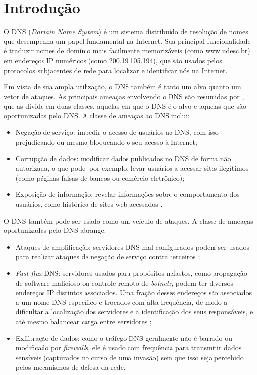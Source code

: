 \chapter{Introdução}
\label{ch:intro}

O DNS (\textit{Domain Name System}) \cite{rfc1034} é um sistema
distribuído de resolução de nomes que desempenha um papel fundamental
na Internet. Sua principal funcionalidade é traduzir nomes de domínio
mais facilmente memorizáveis (como \url{www.udesc.br}) em endereços IP
numéricos (como 200.19.105.194), que são usados pelos protocolos
subjacentes de rede para localizar e identificar nós na Internet.

Em vista de sua ampla utilização, o DNS também é tanto um alvo quanto
um vetor de ataques. As principais ameaças envolvendo o DNS são
resumidas por \cite{Conrad:2012:tidssr}, que as divide em duas
classes, aquelas em que o DNS é o alvo e aquelas que são oportunizadas
pelo DNS\@. A classe de ameaças ao DNS inclui:

\begin{itemize}

\item Negação de serviço: impedir o acesso de usuários ao DNS, com isso
  prejudicando ou mesmo bloqueando o seu acesso à Internet;

\item Corrupção de dados: modificar dados publicados no DNS de forma
  não autorizada, o que pode, por exemplo, levar usuários a acessar
  sites ilegítimos (como páginas falsas de bancos ou comércio
  eletrônico);

\item Exposição de informação: revelar informações sobre o
  comportamento dos usuários, como histórico de sites web acessados \cite{cert3}.
\end{itemize}

O DNS também pode ser usado como um veículo de ataques. A classe de
ameaças oportunizadas pelo DNS abrange:

\begin{itemize}
\item Ataques de amplificação: servidores DNS mal configurados podem ser
  usados para realizar ataques de negação de serviço contra terceiros \cite{cert3};

\item \textit{Fast flux} DNS: servidores usados para propósitos
  nefastos, como propagação de software malicioso ou controle remoto
  de \textit{botnets}, podem ter diversos endereços IP distintos
  associados. Uma fração desses endereços são associados a um nome DNS
  específico e trocados com alta frequência, de modo a dificultar a
  localização dos servidores e a identificação dos seus responsáveis,
  e até mesmo balancear carga entre servidores
  \cite{Salusky:2007:ffsn};

\item Exfiltração de dados: como o tráfego DNS geralmente não é
  barrado ou modificado por \textit{firewalls}, ele é usado com
  frequência para transmitir dados sensíveis (capturados no curso
  de uma invasão) sem que isso seja percebido pelos mecanismos de
  defesa da rede.
\end{itemize}  
  
